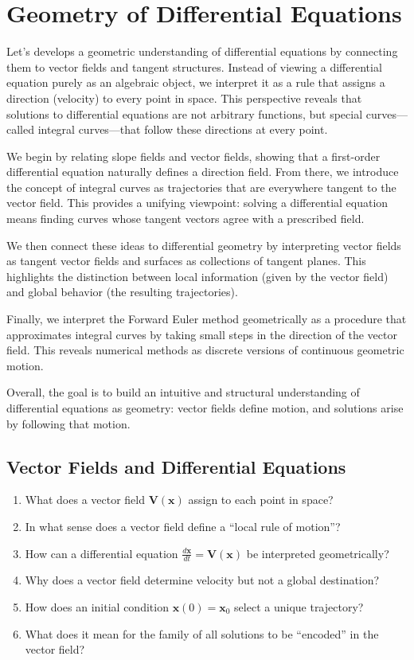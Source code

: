 \section {Geometry of Differential Equations}

Let's develops a geometric understanding of differential equations by connecting them to vector fields and tangent structures. Instead of viewing a differential equation purely as an algebraic object, we interpret it as a rule that assigns a direction (velocity) to every point in space. This perspective reveals that solutions to differential equations are not arbitrary functions, but special curves—called integral curves—that follow these directions at every point.

We begin by relating slope fields and vector fields, showing that a first-order differential equation naturally defines a direction field. From there, we introduce the concept of integral curves as trajectories that are everywhere tangent to the vector field. This provides a unifying viewpoint: solving a differential equation means finding curves whose tangent vectors agree with a prescribed field.

We then connect these ideas to differential geometry by interpreting vector fields as tangent vector fields and surfaces as collections of tangent planes. This highlights the distinction between local information (given by the vector field) and global behavior (the resulting trajectories).

Finally, we interpret the Forward Euler method geometrically as a procedure that approximates integral curves by taking small steps in the direction of the vector field. This reveals numerical methods as discrete versions of continuous geometric motion.

Overall, the goal is to build an intuitive and structural understanding of differential equations as geometry: vector fields define motion, and solutions arise by following that motion.

\subsection{Vector Fields and Differential Equations}

\begin{enumerate}
  \item What does a vector field $\mathbf{V}(\mathbf{x})$ assign to each point in space?
  \item In what sense does a vector field define a ``local rule of motion''?
  \item How can a differential equation $\frac{d\mathbf{x}}{dt} = \mathbf{V}(\mathbf{x})$ be interpreted geometrically?
  \item Why does a vector field determine velocity but not a global destination?
  \item How does an initial condition $\mathbf{x}(0)=\mathbf{x}_0$ select a unique trajectory?
  \item What does it mean for the family of all solutions to be ``encoded'' in the vector field?
\end{enumerate}

